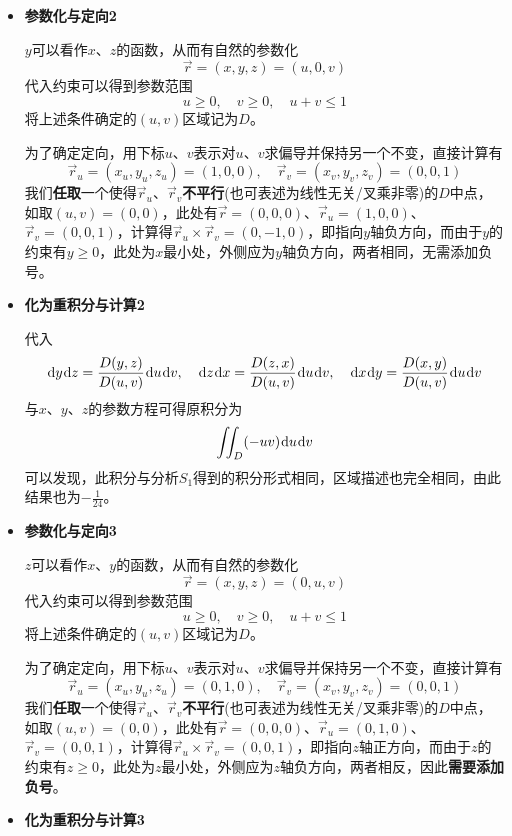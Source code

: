 \documentclass[a4paper,UTF8,fontset=windows,AutoFakeBold]{ctexart}
\newcommand*{\dr}{\hspace{0.07em}\mathrm{d}}
\newcommand*{\rv}{\vec{r}}
\theoremstyle{ex}
\begin{document}
\begin{enumerate}
{\begin{itemize}
            \item \textbf{参数化与定向2}
            
            $y$可以看作$x$、$z$的函数，从而有自然的参数化
            $$\vec{r}=(x,y,z)=(u,0,v)$$
            代入约束可以得到参数范围
            $$u\ge0,\quad v\ge0,\quad u+v\le1$$
            将上述条件确定的$(u,v)$区域记为$D$。

            为了确定定向，用下标$u$、$v$表示对$u$、$v$求偏导并保持另一个不变，直接计算有
            $$\rv_u=(x_u,y_u,z_u)=(1,0,0),\quad\rv_v=(x_v,y_v,z_v)=(0,0,1)$$
            我们\textbf{任取}一个使得$\rv_u$、$\rv_v$\textbf{不平行}(也可表述为线性无关/叉乘非零)的$D$中点，如取$(u,v)=(0,0)$，此处有$\rv=(0,0,0)$、$\rv_u=(1,0,0)$、$\rv_v=(0,0,1)$，计算得$\rv_u\times\rv_v=(0,-1,0)$，即指向$y$轴负方向，而由于$y$的约束有$y\ge0$，此处为$x$最小处，外侧应为$y$轴负方向，两者相同，无需添加负号。
            
            \item \textbf{化为重积分与计算2}
            
            代入
            $$\dr y\dr z=\frac{D(y,z)}{D(u,v)}\dr u\dr v,\quad\dr z\dr x=\frac{D(z,x)}{D(u,v)}\dr u\dr v,\quad\dr x\dr y=\frac{D(x,y)}{D(u,v)}\dr u\dr v$$
            与$x$、$y$、$z$的参数方程可得原积分为
            $$\iint_D(-uv)\dr u\dr v$$
            可以发现，此积分与分析$S_1$得到的积分形式相同，区域描述也完全相同，由此结果也为$-\frac{1}{24}$。

            \item \textbf{参数化与定向3}
            
            $z$可以看作$x$、$y$的函数，从而有自然的参数化
            $$\vec{r}=(x,y,z)=(0,u,v)$$
            代入约束可以得到参数范围
            $$u\ge0,\quad v\ge0,\quad u+v\le1$$
            将上述条件确定的$(u,v)$区域记为$D$。

            为了确定定向，用下标$u$、$v$表示对$u$、$v$求偏导并保持另一个不变，直接计算有
            $$\rv_u=(x_u,y_u,z_u)=(0,1,0),\quad\rv_v=(x_v,y_v,z_v)=(0,0,1)$$
            我们\textbf{任取}一个使得$\rv_u$、$\rv_v$\textbf{不平行}(也可表述为线性无关/叉乘非零)的$D$中点，如取$(u,v)=(0,0)$，此处有$\rv=(0,0,0)$、$\rv_u=(0,1,0)$、$\rv_v=(0,0,1)$，计算得$\rv_u\times\rv_v=(0,0,1)$，即指向$z$轴正方向，而由于$z$的约束有$z\ge0$，此处为$z$最小处，外侧应为$z$轴负方向，两者相反，因此\textbf{需要添加负号}。
            
            \item \textbf{化为重积分与计算3}
            

\end{itemize}}
\end{enumerate}
\end{document}
